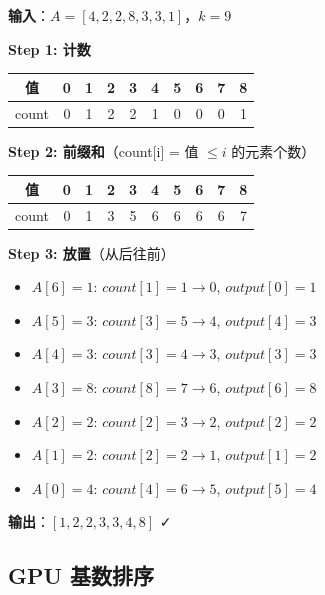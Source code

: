 \documentclass[12pt, a4paper]{ctexart}
\begin{document}
\begin{blackboard}[计数排序手算]

\textbf{输入}：$A = [4, 2, 2, 8, 3, 3, 1]$，$k = 9$

\textbf{Step 1: 计数}
\begin{center}
\begin{tabular}{c|ccccccccc}
值 & 0 & 1 & 2 & 3 & 4 & 5 & 6 & 7 & 8 \\
\hline
count & 0 & 1 & 2 & 2 & 1 & 0 & 0 & 0 & 1 \\
\end{tabular}
\end{center}

\textbf{Step 2: 前缀和}（count[i] = 值 $\leq i$ 的元素个数）
\begin{center}
\begin{tabular}{c|ccccccccc}
值 & 0 & 1 & 2 & 3 & 4 & 5 & 6 & 7 & 8 \\
\hline
count & 0 & 1 & 3 & 5 & 6 & 6 & 6 & 6 & 7 \\
\end{tabular}
\end{center}

\textbf{Step 3: 放置}（从后往前）
\begin{itemize}
    \item $A[6]=1$: $count[1]=1 \to 0$, $output[0]=1$
    \item $A[5]=3$: $count[3]=5 \to 4$, $output[4]=3$
    \item $A[4]=3$: $count[3]=4 \to 3$, $output[3]=3$
    \item $A[3]=8$: $count[8]=7 \to 6$, $output[6]=8$
    \item $A[2]=2$: $count[2]=3 \to 2$, $output[2]=2$
    \item $A[1]=2$: $count[2]=2 \to 1$, $output[1]=2$
    \item $A[0]=4$: $count[4]=6 \to 5$, $output[5]=4$
\end{itemize}

\textbf{输出}：$[1, 2, 2, 3, 3, 4, 8]$ ✓

\end{blackboard}

\subsection{GPU 基数排序}
\end{document}
